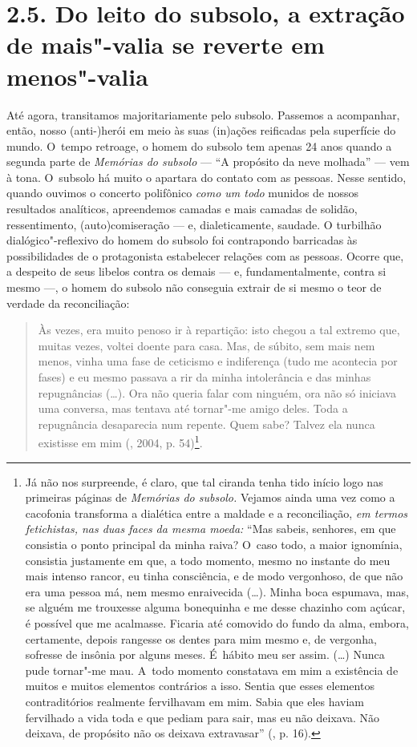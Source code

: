 \section{2.5. Do leito do subsolo, a extração de mais"-valia se reverte em
menos"-valia}

Até agora, transitamos majoritariamente pelo subsolo. Passemos a
acompanhar, então, nosso \mbox{(anti-)herói} em meio às suas (in)ações
reificadas pela superfície do mundo. O~tempo retroage, o homem do
subsolo tem apenas 24 anos quando a segunda parte de \emph{Memórias do
subsolo} --- ``A propósito da neve molhada'' --- vem à tona. O~subsolo há
muito o apartara do contato com as pessoas. Nesse sentido, quando
ouvimos o concerto polifônico \emph{como um todo} munidos de nossos
resultados analíticos, apreendemos camadas e mais camadas de solidão,
ressentimento, (auto)comiseração --- e, dialeticamente, saudade. O
turbilhão dialógico"-reflexivo do homem do subsolo foi contrapondo
barricadas às possibilidades de o protagonista estabelecer relações com
as pessoas. Ocorre que, a despeito de seus libelos contra os demais ---
e, fundamentalmente, contra si mesmo ---, o homem do subsolo não
conseguia extrair de si mesmo o teor de verdade da reconciliação:

\begin{quote}
Às vezes, era muito penoso ir à repartição: isto chegou a tal extremo
que, muitas vezes, voltei doente para casa. Mas, de súbito, sem mais nem
menos, vinha uma fase de ceticismo e indiferença (tudo me acontecia por
fases) e eu mesmo passava a rir da minha intolerância e das minhas
repugnâncias (\ldots). Ora não queria falar com ninguém, ora não só
iniciava uma conversa, mas tentava até tornar"-me amigo deles. Toda a
repugnância desaparecia num repente. Quem sabe? Talvez ela nunca
existisse em mim (, 2004, p. 54)\footnote{Já não nos
  surpreende, é claro, que tal ciranda tenha tido início logo nas
  primeiras páginas de \emph{Memórias do subsolo.} Vejamos ainda uma vez
  como a cacofonia transforma a dialética entre a maldade e a
  reconciliação, \emph{em termos fetichistas, nas duas faces da mesma
  moeda:} ``Mas sabeis, senhores, em que consistia o ponto principal da
  minha raiva? O~caso todo, a maior ignomínia, consistia justamente em
  que, a todo momento, mesmo no instante do meu mais intenso rancor, eu
  tinha consciência, e de modo vergonhoso, de que não era uma pessoa má,
  nem mesmo enraivecida (\ldots). Minha boca espumava, mas, se alguém me
  trouxesse alguma bonequinha e me desse chazinho com açúcar, é possível
  que me acalmasse. Ficaria até comovido do fundo da alma, embora,
  certamente, depois rangesse os dentes para mim mesmo e, de vergonha,
  sofresse de insônia por alguns meses. É~hábito meu ser assim. (\ldots)
  Nunca pude tornar"-me mau. A~todo momento constatava em mim a
  existência de muitos e muitos elementos contrários a isso. Sentia que
  esses elementos contraditórios realmente fervilhavam em mim. Sabia que
  eles haviam fervilhado a vida toda e que pediam para sair, mas eu não
  deixava. Não deixava, de propósito não os deixava extravasar'' (,
  p. 16).}.
\end{quote}

